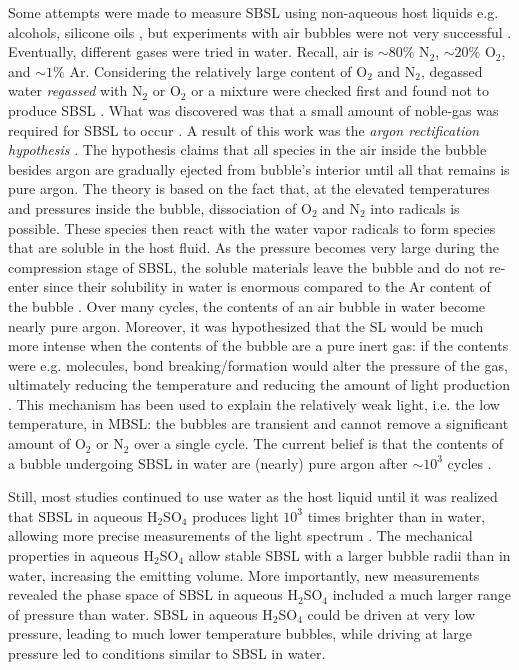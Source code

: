 \documentclass[prb,aps,nofootinbib,superscriptaddress,floatfix]{revtex4-2}
\begin{document}
Some attempts were made to measure SBSL using non-aqueous host liquids e.g. alcohols, silicone oils \cite{weninger1995sonoluminescence,barber1997defining}, but experiments with air bubbles were not very successful \cite{barber1997defining}. Eventually, different gases were tried in water. Recall, air is $\sim 80\%$ N$_2$, $\sim 20\%$ O$_2$, and $\sim 1\% $ Ar. Considering the relatively large content of O$_2$ and N$_2$, degassed water \emph{regassed} with N$_2$ or O$_2$ or a mixture were checked first and found not to produce SBSL \cite{hiller1994effect}. What was discovered was that a small amount of noble-gas was required for SBSL to occur \cite{barber1997defining,hiller1994effect,brenner2002single}. A result of this work was the \emph{argon rectification hypothesis} \cite{lohse1997sonoluminescing,brenner2002single,yasui2018acoustic,suslick2008inside}. The hypothesis claims that all species in the air inside the bubble besides argon are gradually ejected from bubble's interior until all that remains is pure argon. The theory is based on the fact that, at the elevated temperatures and pressures inside the bubble, dissociation of O$_2$ and N$_2$ into radicals is possible. These species then react with the water vapor radicals to form species that are soluble in the host fluid. As the pressure becomes very large during the compression stage of SBSL, the soluble materials leave the bubble and do not re-enter since their solubility in water is enormous compared to the Ar content of the bubble \cite{lohse1997sonoluminescing}. Over many cycles, the contents of an air bubble in water become nearly pure argon. Moreover, it was hypothesized that the SL would be much more intense when the contents of the bubble are a pure inert gas: if the contents were e.g. molecules, bond breaking/formation would alter the pressure of the gas, ultimately reducing the temperature and reducing the amount of light production \cite{brenner2002single,yasui2018acoustic,lohse2018bubble,suslick2008inside}. This mechanism has been used to explain the relatively weak light, i.e. the low temperature, in MBSL: the bubbles are transient and cannot remove a significant amount of O$_2$ or N$_2$ over a single cycle. The current belief is that the contents of a bubble undergoing SBSL in water are (nearly) pure argon after $\sim 10^3$ cycles \cite{brenner2002single,yasui2018acoustic}.  

Still, most studies continued to use water as the host liquid until it was realized that SBSL in aqueous H$_2$SO$_4$ produces light $10^3$ times brighter than in water, allowing more precise measurements of the light spectrum \cite{flannigan2005plasma,flannigan2006measurement}. The mechanical properties in aqueous H$_2$SO$_4$ allow stable SBSL with a larger bubble radii than in water, increasing the emitting volume. More importantly, new measurements revealed the phase space of SBSL in aqueous H$_2$SO$_4$ included a much larger range of pressure than water. SBSL in aqueous H$_2$SO$_4$ could be driven at very low pressure, leading to much lower temperature bubbles, while driving at large pressure led to conditions similar to SBSL in water. 
\end{document}
